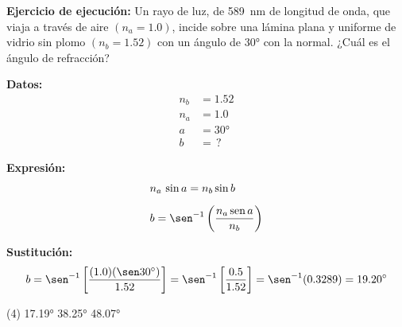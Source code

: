 \documentclass[12pt]{exam}
\begin{document}
\begin{questions}
    \setcounter{question}{15} \question \label{Ejercicio_06} \textbf{Ejercicio de ejecución:} Un rayo de luz, de \SI{589}{\nano\meter} de longitud de onda, que viaja a través de aire $(n_{a} = 1.0)$, incide sobre una lámina plana y uniforme de vidrio sin plomo $(n_{b} = 1.52)$ con un ángulo de \ang{30} con la normal. ¿Cuál es el ángulo de refracción?

    \vspace*{0.3cm}
    \begin{minipage}[t]{0.35\linewidth}
    \textbf{Datos: }
    \begin{align*}
    n_{b} &= 1.52 \\
    n_{a} &= 1.0 \\
    a &= \ang{30} \\
    b &= \, ?
    \end{align*}
    \end{minipage}
    \hspace{1cm}
    \begin{minipage}[t]{0.4\linewidth}
    \textbf{Expresión:}
    \begin{align*}
    &n_{a} \, \sin a = n_{b} \sin b \\[0.5em]
    &b = \sen^{-1} \left(\dfrac{n_{a} \, \text{sen} \, a}{n_{b}} \right)
    \end{align*}
    \end{minipage}

    \vspace*{0.3cm}
    \textbf{Sustitución:}
    \begin{align*}
    b = \sen^{-1} \left[ \dfrac{(1.0)(\sen \ang{30})}{1.52} \right] = \sen^{-1} \left[ \dfrac{0.5}{1.52} \right] = \sen^{-1} (0.3289) = \ang{19.20}
    \end{align*}

    \vspace{0.3cm}
    \begin{tasks}(4)
        \task \ang{17.19}
        \task {}
        \task \ang{38.25}
        \task \ang{48.07}
    \end{tasks}


    

\end{questions}
\end{document}
